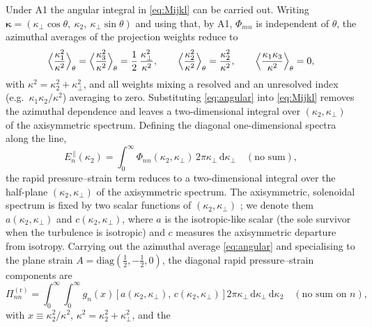 \documentclass[11pt,a4paper]{article}
\begin{document}
Under A1 the angular integral in \eqref{eq:Mijkl} can be carried out. Writing
$\boldsymbol{\kappa}=(\kappa_\perp\cos\theta,\ \kappa_2,\
\kappa_\perp\sin\theta)$ and using that, by A1, $\Phi_{mn}$ is independent of
$\theta$, the azimuthal averages of the projection weights reduce to
\begin{equation}
  \Bigl\langle \frac{\kappa_1^2}{\kappa^2}\Bigr\rangle_\theta
  = \Bigl\langle \frac{\kappa_3^2}{\kappa^2}\Bigr\rangle_\theta
  = \frac{1}{2}\,\frac{\kappa_\perp^2}{\kappa^2},
  \qquad
  \Bigl\langle \frac{\kappa_2^2}{\kappa^2}\Bigr\rangle_\theta
  = \frac{\kappa_2^2}{\kappa^2},
  \qquad
  \Bigl\langle \frac{\kappa_1\kappa_3}{\kappa^2}\Bigr\rangle_\theta = 0,
  \label{eq:angular}
\end{equation}
with $\kappa^2=\kappa_2^2+\kappa_\perp^2$, and all weights mixing a resolved
and an unresolved index (e.g.\ $\kappa_1\kappa_2/\kappa^2$) averaging to zero.
Substituting \eqref{eq:angular} into \eqref{eq:Mijkl} removes the azimuthal
dependence and leaves a two-dimensional integral over $(\kappa_2,\kappa_\perp)$
of the axisymmetric spectrum. Defining the diagonal one-dimensional spectra
along the line,
\begin{equation}
  E_n^{\,\|}(\kappa_2)
   = \int_0^\infty \Phi_{nn}(\kappa_2,\kappa_\perp)\,
     2\pi\kappa_\perp\,\mathrm{d}\kappa_\perp
   \quad(\text{no sum}),
   \label{eq:Epar}
\end{equation}
the rapid pressure--strain term reduces to a two-dimensional integral over the
half-plane $(\kappa_2,\kappa_\perp)$ of the axisymmetric spectrum. The
axisymmetric, solenoidal spectrum is fixed by two scalar functions of
$(\kappa_2,\kappa_\perp)$ \citep{Batchelor1946,ChandrasekharAxisym1950}; we
denote them $a(\kappa_2,\kappa_\perp)$ and $c(\kappa_2,\kappa_\perp)$, where
$a$ is the isotropic-like scalar (the sole survivor when the turbulence is
isotropic) and $c$ measures the axisymmetric departure from isotropy. Carrying
out the azimuthal average \eqref{eq:angular} and specialising to the plane
strain $A=\mathrm{diag}(\tfrac12,-\tfrac12,0)$, the diagonal rapid
pressure--strain components are
\begin{equation}
  \Pi^{(\mathrm r)}_{nn}
  = \int_{0}^{\infty}\!\!\int_{0}^{\infty}
      g_{n}(x)\,\bigl[\,a(\kappa_2,\kappa_\perp),\,c(\kappa_2,\kappa_\perp)\,\bigr]\,
      2\pi\kappa_\perp\,\mathrm{d}\kappa_\perp\,\mathrm{d}\kappa_2
   \quad(\text{no sum on }n),
  \label{eq:Piclosed}
\end{equation}
with $x\equiv\kappa_2^2/\kappa^2$, $\kappa^2=\kappa_2^2+\kappa_\perp^2$, and the
\end{document}
